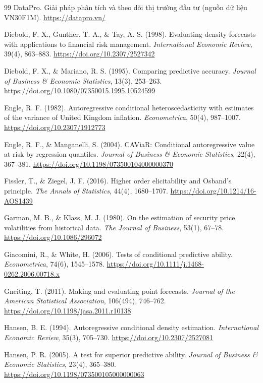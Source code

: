 \documentclass[12pt,a4paper]{article}
\theoremstyle{definition}
\theoremstyle{remark}
\begin{document}
\begin{thebibliography}{99}
 DataPro. Giải pháp phân tích và theo dõi thị trường đầu tư (nguồn dữ liệu VN30F1M). \url{https://datapro.vn/}

 Diebold, F. X., Gunther, T. A., \& Tay, A. S. (1998). Evaluating density forecasts with applications to financial risk management. \emph{International Economic Review}, 39(4), 863--883. \url{https://doi.org/10.2307/2527342}

 Diebold, F. X., \& Mariano, R. S. (1995). Comparing predictive accuracy. \emph{Journal of Business \& Economic Statistics}, 13(3), 253--263. \url{https://doi.org/10.1080/07350015.1995.10524599}

 Engle, R. F. (1982). Autoregressive conditional heteroscedasticity with estimates of the variance of United Kingdom inflation. \emph{Econometrica}, 50(4), 987--1007. \url{https://doi.org/10.2307/1912773}

 Engle, R. F., \& Manganelli, S. (2004). CAViaR: Conditional autoregressive value at risk by regression quantiles. \emph{Journal of Business \& Economic Statistics}, 22(4), 367--381. \url{https://doi.org/10.1198/073500104000000370}

 Fissler, T., \& Ziegel, J. F. (2016). Higher order elicitability and Osband's principle. \emph{The Annals of Statistics}, 44(4), 1680--1707. \url{https://doi.org/10.1214/16-AOS1439}

 Garman, M. B., \& Klass, M. J. (1980). On the estimation of security price volatilities from historical data. \emph{The Journal of Business}, 53(1), 67--78. \url{https://doi.org/10.1086/296072}

 Giacomini, R., \& White, H. (2006). Tests of conditional predictive ability. \emph{Econometrica}, 74(6), 1545--1578. \url{https://doi.org/10.1111/j.1468-0262.2006.00718.x}

 Gneiting, T. (2011). Making and evaluating point forecasts. \emph{Journal of the American Statistical Association}, 106(494), 746--762. \url{https://doi.org/10.1198/jasa.2011.r10138}

 Hansen, B. E. (1994). Autoregressive conditional density estimation. \emph{International Economic Review}, 35(3), 705--730. \url{https://doi.org/10.2307/2527081}

 Hansen, P. R. (2005). A test for superior predictive ability. \emph{Journal of Business \& Economic Statistics}, 23(4), 365--380. \url{https://doi.org/10.1198/073500105000000063}


\end{thebibliography}
\end{document}
